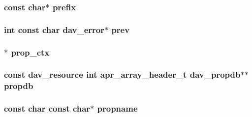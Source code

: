 \subsubsection[{\texorpdfstring{prefix}{prefix}}]{\setlength{\rightskip}{0pt plus 5cm}const char$\ast$ prefix}\hypertarget{group__MOD__DAV_ga5b41c5ae4505891e6c53e26df197e02b}{}\label{group__MOD__DAV_ga5b41c5ae4505891e6c53e26df197e02b}
\subsubsection[{\texorpdfstring{prev}{prev}}]{ {\bf int} const char {\bf dav\+\_\+error}$\ast$ prev}\hypertarget{group__MOD__DAV_gacc5462e7a268b365a64468a6cf83b727}{}\label{group__MOD__DAV_gacc5462e7a268b365a64468a6cf83b727}
\subsubsection[{\texorpdfstring{prop\+\_\+ctx}{prop_ctx}}]{ $\ast$ prop\+\_\+ctx}\hypertarget{group__MOD__DAV_ga558264c251695440cf0314f8fee98ee9}{}\label{group__MOD__DAV_ga558264c251695440cf0314f8fee98ee9}
\subsubsection[{\texorpdfstring{propdb}{propdb}}]{ const {\bf dav\+\_\+resource} {\bf int} {\bf apr\+\_\+array\+\_\+header\+\_\+t} {\bf dav\+\_\+propdb}$\ast$$\ast$ propdb}\hypertarget{group__MOD__DAV_gac428117c2c7c0121d6e49a52085fd196}{}\label{group__MOD__DAV_gac428117c2c7c0121d6e49a52085fd196}
\subsubsection[{\texorpdfstring{propname}{propname}}]{\setlength{\rightskip}{0pt plus 5cm}const char const char$\ast$ propname}\hypertarget{group__MOD__DAV_ga91236178121f18751d683ebbc4a67aba}{}\label{group__MOD__DAV_ga91236178121f18751d683ebbc4a67aba}
